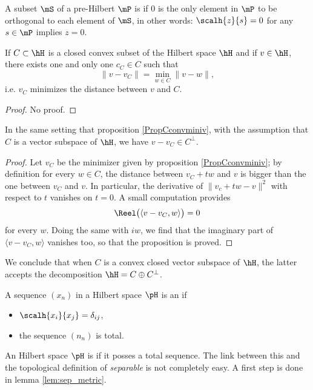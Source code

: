 A subset $\mS$ of a pre-Hilbert $\mP$ is  if $0$ is the only element in $\mP$ to be orthogonal to each element of $\mS$, in other words: $\scalh{z}{s}=0$ for any $s\in\mP$ implies $z=0$.

\begin{proposition}		\label{PropCconvminiv}
If $C\subset\hH$ is a closed convex subset of the Hilbert space $\hH$ and if $v\in\hH$, there exists one and only one $c_C\in C$ such that
\[ 
  \| v-v_C \|=\min_{w\in C}\| v-w \|,		
\]
i.e. $v_C$ minimizes the distance between $v$ and $C$.
\end{proposition}
\begin{proof}
No proof.
\end{proof}

\begin{proposition}
In the same setting that proposition \ref{PropCconvminiv}, with the assumption that $C$ is a vector subspace of $\hH$, we have $v-v_C\in C^{\perp}$.
\end{proposition}

\begin{proof}
Let $v_C$ be the minimizer given by proposition \ref{PropCconvminiv}; by definition for every $w\in C$, the distance between $v_C+tw$ and $v$ is bigger than the one between $v_C$ and $v$. In particular, the derivative of $\| v_c+tw-v \|^2$ with respect to $t$ vanishes on $t=0$. A small computation provides
\[ 
  \Reel\big( \langle v-v_C, w\rangle  \big)=0
\]
for every $w$. Doing the same with $iw$, we find that the imaginary part of $\langle v-v_C, w\rangle $ vanishes too, so that the proposition is proved.
\end{proof}

We conclude that when $C$ is a convex closed vector subspace of $\hH$, the latter accepts the decomposition $\hH=C\oplus C^{\perp}$.

A sequence $(x_n)$ in a Hilbert space $\pH$ is an   if 
\begin{itemize}
\item $\scalh{x_i}{x_j}=\delta_{ij}$,
\item the sequence $(n_n)$ is total.
\end{itemize}

An Hilbert space $\pH$ is  if it posses a total sequence. The link between this and the topological definition of \emph{separable} is not completely easy. A first step is done in lemma \ref{lem:sep_metric}.

